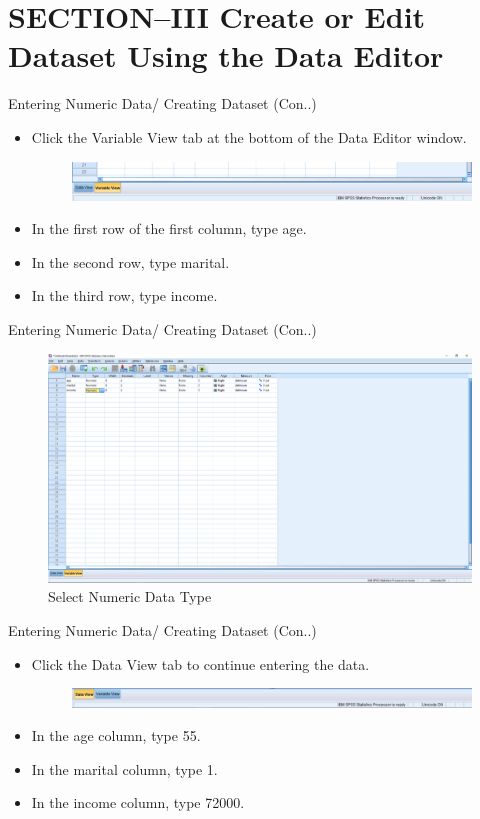 \section{SECTION--III Create or Edit Dataset Using the Data Editor}
\begin{frame}[t]{Entering Numeric Data/ Creating Dataset (Con..)}
\begin{itemize}
	\item Click the Variable View tab at the bottom of the Data Editor window.
	\begin{figure}
		\centering
		\includegraphics[width= 12cm]{img/variable_v1}
	\end{figure}
	\item In the first row of the first column, type age.
	\item In the second row, type marital.
	\item In the third row, type income.
\end{itemize}
\end{frame}
\begin{frame}[t]{Entering Numeric Data/ Creating Dataset (Con..)}
		\begin{figure}
		\centering
		\includegraphics[width= 12cm]{img/variable_v2}
		\caption{Select Numeric Data Type}
	\end{figure}
\end{frame}
\begin{frame}[t]{Entering Numeric Data/ Creating Dataset (Con..)}
	\begin{itemize}
		\item Click the Data View tab to continue entering the data.
		\begin{figure}
			\centering
			\includegraphics[width= 12cm]{img/data_v2}
		\end{figure}
		\item In the age column, type 55.
		\item In the marital column, type 1.
		\item In the income column, type 72000.
	\end{itemize}
\end{frame}
